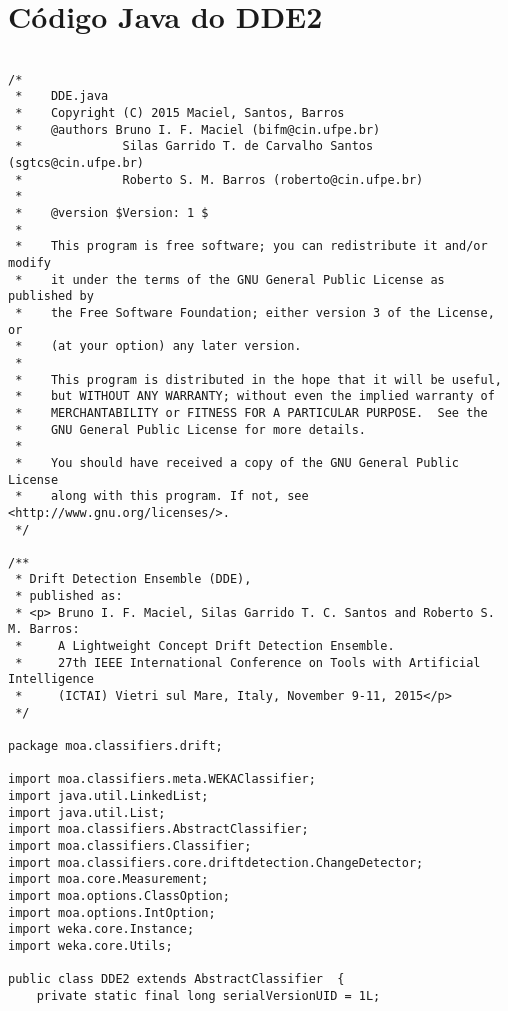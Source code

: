 \chapter{Código Java do DDE2}
\label{sec:dde2java}






\begin{lstlisting}[caption={Código em linguagem de programação Java do DDE2},label=dde2java]

/*
 *    DDE.java
 *    Copyright (C) 2015 Maciel, Santos, Barros 
 *    @authors Bruno I. F. Maciel (bifm@cin.ufpe.br)
 *    			Silas Garrido T. de Carvalho Santos (sgtcs@cin.ufpe.br)
 *             	Roberto S. M. Barros (roberto@cin.ufpe.br) 
 *             
 *    @version $Version: 1 $
 *
 *    This program is free software; you can redistribute it and/or modify
 *    it under the terms of the GNU General Public License as published by
 *    the Free Software Foundation; either version 3 of the License, or
 *    (at your option) any later version.
 *
 *    This program is distributed in the hope that it will be useful,
 *    but WITHOUT ANY WARRANTY; without even the implied warranty of
 *    MERCHANTABILITY or FITNESS FOR A PARTICULAR PURPOSE.  See the
 *    GNU General Public License for more details.
 *
 *    You should have received a copy of the GNU General Public License
 *    along with this program. If not, see <http://www.gnu.org/licenses/>.
 */

/**
 * Drift Detection Ensemble (DDE),
 * published as:
 * <p> Bruno I. F. Maciel, Silas Garrido T. C. Santos and Roberto S. M. Barros: 
 *     A Lightweight Concept Drift Detection Ensemble. 
 *     27th IEEE International Conference on Tools with Artificial Intelligence 
 *     (ICTAI) Vietri sul Mare, Italy, November 9-11, 2015</p>
 */

package moa.classifiers.drift;

import moa.classifiers.meta.WEKAClassifier;
import java.util.LinkedList;
import java.util.List;
import moa.classifiers.AbstractClassifier;
import moa.classifiers.Classifier;
import moa.classifiers.core.driftdetection.ChangeDetector;
import moa.core.Measurement;
import moa.options.ClassOption;
import moa.options.IntOption;
import weka.core.Instance;
import weka.core.Utils;

public class DDE2 extends AbstractClassifier  {
    private static final long serialVersionUID = 1L;
	

\end{lstlisting}
